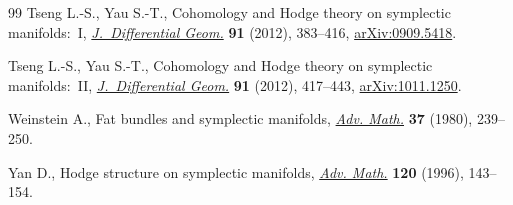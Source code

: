 \documentclass[10pt,a4paper]{amsart}
\numberwithin{equation}{section}
\begin{document}
\begin{thebibliography}{99}
Tseng L.-S., Yau S.-T., Cohomology and {H}odge theory on symplectic
 manifolds:~{I}, \href{https://doi.org/10.4310/jdg/1349292670}{\textit{J.~Differential Geom.}} \textbf{91} (2012), 383--416,
 \href{https://arxiv.org/abs/0909.5418}{arXiv:0909.5418}.

Tseng L.-S., Yau S.-T., Cohomology and {H}odge theory on symplectic
 manifolds:~{II}, \href{https://doi.org/10.4310/jdg/1349292671}{\textit{J.~Differential Geom.}} \textbf{91} (2012), 417--443,
 \href{https://arxiv.org/abs/1011.1250}{arXiv:1011.1250}.

Weinstein A., Fat bundles and symplectic manifolds, \href{https://doi.org/10.1016/0001-8708(80)90035-3}{\textit{Adv. Math.}}
 \textbf{37} (1980), 239--250.

Yan D., Hodge structure on symplectic manifolds, \href{https://doi.org/10.1006/aima.1996.0034}{\textit{Adv. Math.}}
 \textbf{120} (1996), 143--154.

\end{thebibliography}
\end{document}
